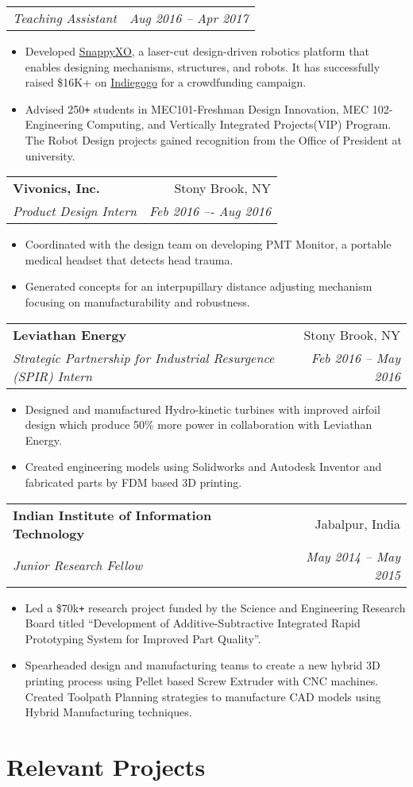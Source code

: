 \documentclass[letterpaper,10pt]{article}
\makeatletter
\newcommand{\resumeHeading}[4]{
  \vspace{-1pt}
    \begin{tabular*}{0.97\textwidth}{l@{\extracolsep{\fill}}r}
      \textbf{#1} & #2 \vspace{-2pt}\\ \vspace{1pt}
      \textit{\small#3} & \textit{\small #4} \\
    \end{tabular*}
}
\newcommand{\resumeSubheadingWithDate}[2]{
    \begin{tabular*}{0.97\textwidth}{l@{\extracolsep{\fill}}r}
      \textit{\small#1} & \textit{\small #2}\\
    \end{tabular*}
    \vspace{+2pt}
}
\newcommand{\resumeSection}[1]{
\vspace{-12pt}
\section{\textbf{#1}}
}
\newcommand{\resumeItemListStart}{
\vspace{-7pt}
\begin{itemize}[leftmargin=14pt]
}
\newcommand{\resumeItemListEnd}{
\vspace{+7pt}
\end{itemize}
}
\newcommand{\resumeItem}[1]{
  \item\small{
      {#1 \vspace{-7pt}
      }
  }
}
\makeatother
\begin{document}
    \vspace{-5pt}
    \resumeSubheadingWithDate{Teaching Assistant}{Aug 2016 -- Apr 2017}
    \resumeItemListStart
    \resumeItem{Developed \href{http://snappyxo.com/}{SnappyXO}, a laser-cut design-driven robotics platform that enables designing mechanisms, structures, and robots. It has successfully raised \$16K+ on \href{https://www.indiegogo.com/projects/snappyxo-a-design-driven-robotics-education-kit}{Indiegogo} for a crowdfunding campaign.}
    \resumeItem{Advised 250\texttt{+} students in MEC101-Freshman Design Innovation, MEC 102-Engineering Computing, and Vertically Integrated Projects(VIP) Program. The Robot Design projects gained recognition from the Office of President at university.}
    \resumeItemListEnd
    
    \resumeHeading
    {Vivonics, Inc.}{Stony Brook, NY}
    {Product Design Intern}{Feb 2016 –- Aug 2016}
    \resumeItemListStart
    \resumeItem{Coordinated with the design team on developing PMT Monitor, a portable medical headset that detects head trauma.}
    \resumeItem{Generated concepts for an interpupillary distance adjusting mechanism focusing on manufacturability and robustness.}
    \resumeItemListEnd
    
    \resumeHeading
    {Leviathan Energy}{Stony Brook, NY}
    {Strategic Partnership for Industrial Resurgence (SPIR) Intern}{Feb 2016 – May 2016}
    \resumeItemListStart
    \resumeItem{Designed and manufactured Hydro-kinetic turbines with improved airfoil design which produce 50\% more power in collaboration with Leviathan Energy.}
    \resumeItem{Created engineering models using Solidworks and Autodesk Inventor and fabricated parts by FDM based 3D printing.}
    \resumeItemListEnd
    
    \resumeHeading
    {Indian Institute of Information Technology}{Jabalpur, India}
    {Junior Research Fellow}{May 2014 -- May 2015}
    \resumeItemListStart
    \resumeItem{Led a \$70k\texttt{+} research project funded by the Science and Engineering Research Board titled “Development of Additive-Subtractive Integrated Rapid Prototyping System for Improved Part Quality”.}
    \resumeItem{Spearheaded design and manufacturing teams to create a new hybrid 3D printing process using Pellet based Screw Extruder with CNC machines. Created Toolpath Planning strategies to manufacture CAD models using Hybrid Manufacturing techniques.}
    \resumeItemListEnd



\resumeSection{Relevant Projects}
\end{document}
